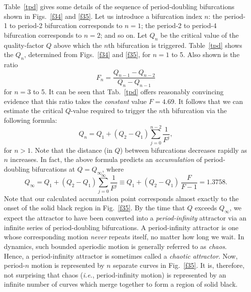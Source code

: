 Table~\ref{tpd} gives some details of the sequence of period-doubling bifurcations
shown in Figs.~\ref{f34} and \ref{f35}. Let us introduce a bifurcation index $n$: the
period-1 to period-2 bifurcation corresponds to $n=1$;  the
period-2 to period-4 bifurcation corresponds to $n=2$; and so on. Let $Q_n$ be
the critical value of the quality-factor $Q$ above which the $n$th bifurcation is
triggered. Table~\ref{tpd} shows the $Q_n$, determined from  Figs.~\ref{f34} and \ref{f35}, for
$n=1$ to 5. Also shown is the ratio
\begin{equation}
F_n = \frac{Q_{n-1}-Q_{n-2}}{Q_{n}-Q_{n-1}}
\end{equation}
for $n=3$ to 5. It can be seen that Tab.~\ref{tpd} offers reasonably
convincing  evidence that this ratio takes the {\em constant} value $F=4.69$.
It follows that we can estimate the critical $Q$-value required to trigger the $n$th
 bifurcation via the following formula:
\begin{equation}
Q_n = Q_1 + (Q_2-Q_1)\sum_{j=0}^{n-2}\frac{1}{F^j},
\end{equation}
for $n>1$. Note that the distance (in $Q$) between bifurcations decreases rapidly as
$n$ increases. In fact, the above
formula predicts an {\em accumulation} of period-doubling bifurcations at $Q=Q_\infty$, where
\begin{equation}
Q_\infty = Q_1 + (Q_2-Q_1)\sum_{j=0}^{\infty}\frac{1}{F^j} \equiv Q_1 + (Q_2-Q_1)\,\frac{F}{F-1}=
1.3758.
\end{equation}
Note that our calculated  accumulation point corresponds almost exactly to the onset of the 
solid black region in Fig.~\ref{f35}.
By the time that $Q$ exceeds $Q_\infty$,  we expect the attractor to have been
converted into a {\em period-infinity}
attractor via an infinite series of period-doubling bifurcations. 
A period-infinity  attractor is one  whose corresponding motion {\em never} repeats
itself, no matter
how long we wait. In dynamics, such bounded aperiodic motion is generally referred to as {\em chaos}. 
Hence, a period-infinity attractor is sometimes called a {\em chaotic attractor}. 
Now,  period-$n$ motion is represented by $n$ separate curves in Fig.~\ref{f35}. 
It is, therefore, not surprising that chaos ({\em i.e.}, period-infinity motion) is
represented by an infinite number of curves which merge together to form a region of solid black.


